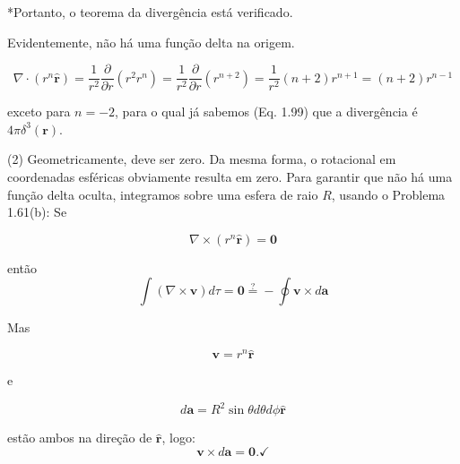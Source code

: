 \documentclass[a4paper,12pt]{article}
\newcommand{\printingbibliography}{%

    \pagestyle{myheadings}
    \markright{}
    \sloppy
    \printbibliography[heading=bibintoc, %
                   title=Refer\^encias %
                  ]
    \fussy%
}
\begin{document}
*Portanto, o teorema da divergência está verificado.

Evidentemente, não há uma função delta na origem.


\begin{equation}
\nabla \cdot \left(r^{n} \hat{\mathbf{r}}\right)=\frac{1}{r^{2}} \frac{\partial}{\partial r}\left(r^{2} r^{n}\right)=\frac{1}{r^{2}} \frac{\partial}{\partial r}\left(r^{n+2}\right)=\frac{1}{r^{2}}(n+2) r^{n+1}=(n+2) r^{n-1}
\end{equation}

exceto para $n=-2$, para o qual já sabemos (Eq. 1.99) que a divergência é $4 \pi \delta^{3}(\mathbf{r})$.

(2) Geometricamente, deve ser zero. Da mesma forma, o rotacional em coordenadas esféricas obviamente resulta em zero. 
Para garantir que não há uma função delta oculta, integramos sobre uma esfera de raio $R$, usando o Problema 1.61(b): 
Se 

\begin{equation}
    \nabla \times\left(r^{n} \hat{\mathbf{r}}\right)=\mathbf{0}
\end{equation}

então
\begin{equation} 
\int(\nabla \times \mathbf{v}) d \tau=\mathbf{0} \stackrel{?}{=} -\oint \mathbf{v} \times d \mathbf{a} 
\end{equation}

Mas 

\begin{equation}
    \mathbf{v}=r^{n} \hat{\mathbf{r}}
\end{equation}

e 

\begin{equation}
    d \mathbf{a}=R^{2}\sin \theta d \theta d \phi \hat{\mathbf{r}}
\end{equation}

estão ambos na direção de $\hat{\mathbf{r}}$, logo:
\begin{equation}
\mathbf{v} \times d \mathbf{a}=\mathbf{0} . \checkmark
\end{equation}

\end{document}
